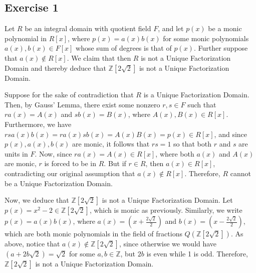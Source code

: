 \subsection*{Exercise 1}
Let $R$ be an integral domain with quotient field $F$, and let $p(x)$ be a monic polynomial in $R[x]$, where $p(x) = a(x)b(x)$ for some monic polynomials $a(x),b(x) \in F[x]$ whose sum of degrees is that of $p(x)$. Further suppose that $a(x) \not\in R[x]$. We claim that then $R$ is not a Unique Factorization Domain and thereby deduce that $\mathbb{Z}[2\sqrt{2}]$ is not a Unique Factorization Domain.

Suppose for the sake of contradiction that $R$ is a Unique Factorization Domain. Then, by Gauss' Lemma, there exist some nonzero $r,s \in F$ such that $ra(x) = A(x)$ and $sb(x) = B(x)$, where $A(x),B(x) \in R[x]$. Furthermore, we have $rsa(x)b(x) = ra(x)sb(x) = A(x)B(x) = p(x) \in R[x]$, and since $p(x), a(x), b(x)$ are monic, it follows that $rs = 1$ so that both $r$ and $s$ are units in $F$. Now, since $ra(x) = A(x) \in R[x]$, where both $a(x)$ and $A(x)$ are monic, $r$ is forced to be in $R$. But if $r \in R$, then $a(x) \in R[x]$, contradicting our original assumption that $a(x) \not\in R[x]$. Therefore, $R$ cannot be a Unique Factorization Domain.

Now, we deduce that $\mathbb{Z}[2\sqrt{2}]$ is not a Unique Factorization Domain. Let $p(x) = x^2 - 2 \in \mathbb{Z}[2\sqrt{2}]$, which is monic as previously. Similarly, we write $p(x) = a(x)b(x)$, where $a(x) = (x + \frac{2\sqrt{2}}{2})$ and $b(x) = (x - \frac{2\sqrt{2}}{2})$, which are both monic polynomials in the field of fractions $Q(\mathbb{Z}[2\sqrt{2}])$. As above, notice that $a(x) \not\in \mathbb{Z}[2\sqrt{2}]$, since otherwise we would have $(a + 2b\sqrt{2}) = \sqrt{2}$ for some $a,b \in \mathbb{Z}$, but $2b$ is even while 1 is odd. Therefore, $\mathbb{Z}[2\sqrt{2}]$ is not a Unique Factorization Domain.